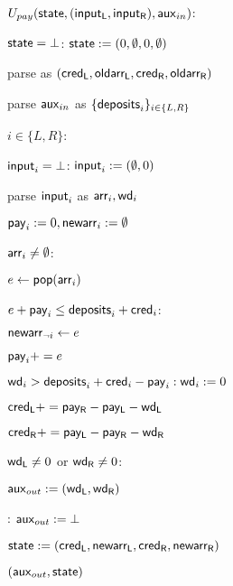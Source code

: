 \begin{bbox}[title=$U_{pay}$]

$U_{pay} ({\mathsf {state}}, ({\mathsf {input_L}},{\mathsf {input_R}}), {\mathsf {aux}}_{in})$:

\quad \If ${\mathsf {state}} = \bot$: ${\mathsf {state}} := (0,\emptyset,0,\emptyset)$

\quad parse  as $({\mathsf {cred_L}},{\mathsf {oldarr_L}},{\mathsf {cred_R}},{\mathsf {oldarr_R}})$

\quad parse ${\mathsf {aux}}_{in}$ as $\{ {\mathsf {deposits}}_i \}_{i \in \{L,R\}}$

\quad \For $i \in \{L,R\}$:

	\qquad \If ${\mathsf {input}}_i = \bot$: ${\mathsf {input}}_i := (\emptyset,0)$

	\qquad parse ${\mathsf {input}}_i$ as ${\mathsf {arr}}_i,{\mathsf {wd}}_i$

	\qquad ${\mathsf {pay}}_i := 0, {\mathsf {newarr}}_i := \emptyset$

	\qquad \While ${\mathsf {arr}}_i \neq \emptyset$:

		\qqquad $e \leftarrow {\mathsf {pop}}({\mathsf {arr}}_i)$

		\qqquad \If $e + {\mathsf {pay}}_i \leq {\mathsf {deposits}}_i + {\mathsf {cred}}_i$:

			\qqqquad ${\mathsf {newarr}}_{\neg i} \leftarrow e$

			\qqquad ${\mathsf {pay}}_i += e$

	\qquad \If ${\mathsf {wd}}_i > {\mathsf {deposits}}_i + {\mathsf {cred}}_i - {\mathsf {pay}}_i: {\mathsf {wd}}_i := 0$

\quad ${\mathsf {cred_L}} += {\mathsf {pay_R}} - {\mathsf {pay_L}} - {\mathsf {wd_L}}$

\quad ${\mathsf {cred_R}} += {\mathsf {pay_L}} - {\mathsf {pay_R}} - {\mathsf {wd_R}}$

\quad \If ${\mathsf {wd_L}} \neq 0$ or ${\mathsf {wd_R}} \neq 0$:

	\qquad ${\mathsf {aux}}_{out} := ({\mathsf {wd_L}},{\mathsf {wd_R}})$

\quad \Else: ${\mathsf {aux}}_{out} := \bot$

\quad ${\mathsf {state}} := ({\mathsf {cred_L}},{\mathsf {newarr_L}},{\mathsf {cred_R}},{\mathsf {newarr_R}})$

\quad \Return $({\mathsf {aux}}_{out}, {\mathsf {state}})$

\end{bbox}
